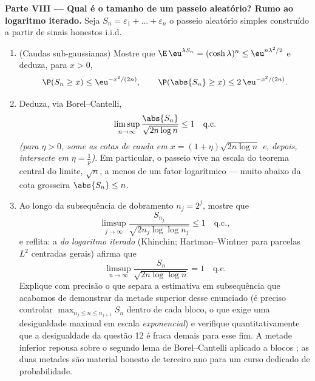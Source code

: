 \begin{problem}
\medskip
\noindent\textbf{Parte VIII --- Qual é o tamanho de um passeio
aleatório? Rumo ao logaritmo iterado.} Seja $S_n = \varepsilon_1 +
\dots + \varepsilon_n$ o passeio aleatório
simples construído a partir de sinais honestos i.i.d.
\begin{enumerate}[resume]
  \item (Caudas sub-gaussianas) Mostre que $\E\,\eu^{\lambda S_n} =
        (\cosh\lambda)^n \leq \eu^{n\lambda^2/2}$ e deduza, para
        $x > 0$,
        \[
        \P(S_n \geq x) \leq \eu^{-x^2/(2n)},
        \qquad
        \P(\abs{S_n} \geq x) \leq 2\,\eu^{-x^2/(2n)} .
        \]
  \item Deduza, via Borel--Cantelli,
        \[
        \limsup_{n\to\infty}\frac{\abs{S_n}}
        {\sqrt{2n\log n}} \leq 1 \quad\text{q.c.}
        \]
        \emph{(para $\eta > 0$, some as cotas de cauda em $x =
        (1 + \eta)\sqrt{2n\log n}$ e, depois,
        intersecte em $\eta = \frac1p$)}. Em particular, o passeio vive na escala do
        teorema central do limite, $\sqrt n$, a menos de um fator logarítmico
        --- muito abaixo da cota grosseira $\abs{S_n} \leq n$.
  \item Ao longo da subsequência de dobramento $n_j = 2^j$, mostre que
        \[
        \limsup_{j\to\infty}\frac{S_{n_j}}
        {\sqrt{2n_j\log\log n_j}} \leq 1 \quad\text{q.c.},
        \]
        e reflita: a \emph{ do logaritmo iterado} (Khinchin;
        Hartman--Wintner para parcelas $L^2$ centradas gerais) afirma
        que
        \[
        \limsup_{n\to\infty}\frac{S_n}
        {\sqrt{2n\log\log n}} = 1 \quad\text{q.c.}
        \]
        Explique com precisão o que separa a estimativa em subsequência
        que acabamos de demonstrar da metade superior desse enunciado (é
        preciso controlar $\max_{n_j \leq n \leq
        n_{j+1}}S_n$ dentro de cada bloco, o que exige uma
        desigualdade maximal em escala \emph{exponencial}) e verifique
        quantitativamente que a desigualdade da questão 12 é fraca demais
        para esse fim. A metade inferior repousa sobre o segundo lema de
        Borel--Cantelli aplicado a blocos ; as duas metades
        são material honesto de terceiro ano para um curso dedicado de
        probabilidade.


\end{enumerate}
\end{problem}
